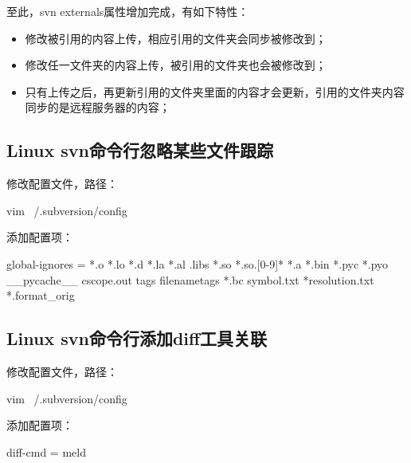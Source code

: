 至此，svn externals属性增加完成，有如下特性：
\begin{itemize}
\item 修改被引用的内容上传，相应引用的文件夹会同步被修改到；
\item 修改任一文件夹的内容上传，被引用的文件夹也会被修改到；
\item 只有上传之后，再更新引用的文件夹里面的内容才会更新，引用的文件夹内容同步的是远程服务器的内容；
\end{itemize}

\subsection{Linux svn命令行忽略某些文件跟踪}
修改配置文件，路径：
\begin{commandbox}
vim ~/.subversion/config
\end{commandbox}
添加配置项：
\begin{messagebox}
global-ignores = *.o *.lo *.d *.la *.al .libs *.so *.so.[0-9]* *.a *.bin *.pyc *.pyo __pycache__ cscope.out tags filenametags *.bc symbol.txt *resolution.txt *.format_orig
\end{messagebox}

\subsection{Linux svn命令行添加diff工具关联}
修改配置文件，路径：
\begin{commandbox}
vim ~/.subversion/config
\end{commandbox}
添加配置项：
\begin{messagebox}
diff-cmd = meld
\end{messagebox}
